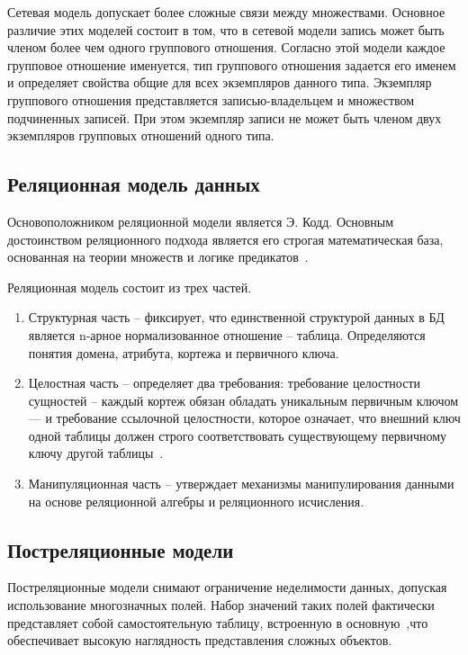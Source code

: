 Сетевая модель допускает более сложные связи между множествами. Основное различие этих моделей состоит в том, что в сетевой модели запись может быть членом более чем одного группового отношения. Согласно этой модели каждое групповое отношение именуется, тип группового отношения задается его именем и определяет свойства общие для всех экземпляров данного типа. Экземпляр группового отношения представляется записью-владельцем и множеством подчиненных записей. При этом экземпляр записи не может быть членом двух экземпляров групповых отношений одного типа.


\subsection{Реляционная модель данных}

Основоположником реляционной модели является Э. Кодд. Основным достоинством реляционного подхода является его строгая математическая база, основанная на теории множеств и логике предикатов~\cite{intro-db-williams}. 

Реляционная модель состоит из трех частей.
\begin{enumerate}
	\item Структурная часть -- фиксирует, что единственной структурой данных в БД является n-арное нормализованное отношение -- таблица. Определяются понятия домена, атрибута, кортежа и первичного ключа.
	\item Целостная часть -- определяет два требования: требование целостности сущностей -- каждый кортеж обязан обладать уникальным первичным ключом --- и требование ссылочной целостности, которое означает, что внешний ключ одной таблицы должен строго соответствовать существующему первичному ключу другой таблицы~\cite{kuznecov-db, intro-db-williams}.
	\item Манипуляционная часть -- утверждает механизмы манипулирования данными на основе реляционной алгебры и реляционного исчисления.
\end{enumerate}

\subsection{Постреляционные модели}

Постреляционные модели снимают ограничение неделимости данных, допуская использование многозначных полей. Набор значений таких полей фактически представляет собой самостоятельную таблицу, встроенную в основную~\cite{kuznecov-db},что обеспечивает высокую наглядность представления сложных объектов.

